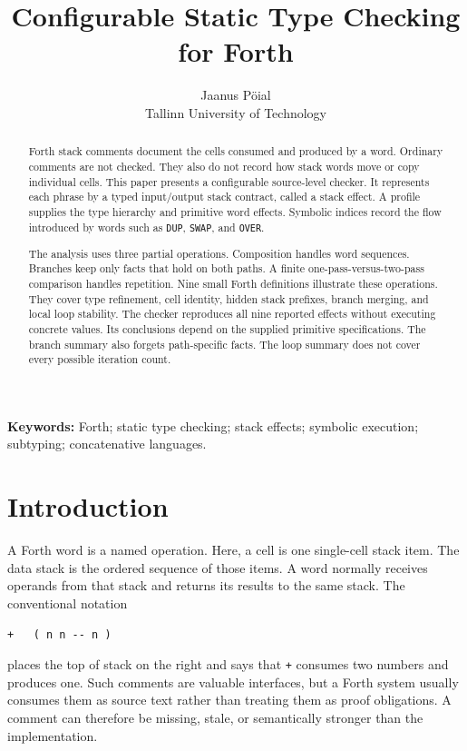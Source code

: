 \documentclass[11pt,a4paper]{article}
\title{Configurable Static Type Checking for Forth}
\author{Jaanus Pöial\\Tallinn University of Technology}
\date{}
\begin{document}
\maketitle

\begin{abstract}
Forth stack comments document the cells consumed and produced by a word.
Ordinary comments are not checked.  They also do not record how stack words
move or copy individual cells.  This paper presents a configurable source-level
checker.  It represents each phrase by a typed input/output stack contract,
called a stack effect.  A profile supplies the type hierarchy and primitive
word effects.  Symbolic indices record the flow introduced by words such as
\texttt{DUP}, \texttt{SWAP}, and \texttt{OVER}.

The analysis uses three partial operations.  Composition handles word
sequences.  Branches keep only facts that hold on both paths.  A finite
one-pass-versus-two-pass comparison handles repetition.  Nine small Forth
definitions illustrate these operations.  They cover type refinement, cell
identity, hidden stack prefixes, branch merging, and local loop stability.
The checker reproduces all nine reported effects without executing concrete
values.  Its conclusions depend on the supplied primitive specifications.
The branch summary also forgets path-specific facts.  The loop summary does
not cover every possible iteration count.
\end{abstract}

\noindent\textbf{Keywords:} Forth; static type checking; stack effects;
symbolic execution; subtyping; concatenative languages.

\section{Introduction}

A Forth word is a named operation.  Here, a cell is one single-cell stack
item.  The data stack is the ordered sequence of those items.  A word normally
receives operands from that stack and returns its results to the same stack.
The conventional notation
\begin{verbatim}
+   ( n n -- n )
\end{verbatim}
places the top of stack on the right and says that \texttt{+} consumes two
numbers and produces one.  Such comments are valuable interfaces, but a Forth
system usually consumes them as source text rather than treating them as
proof obligations.  A comment can therefore be missing, stale, or semantically
stronger than the implementation.
\end{document}
